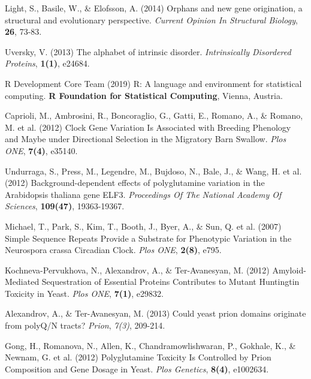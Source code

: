 \documentclass[a4,center,fleqn]{NAR}
\begin{document}
\begin{thebibliography}{4}
Light, S., Basile, W., \& Elofsson, A. (2014)
Orphans and new gene origination, a structural and evolutionary perspective. 
\textit{Current Opinion In Structural Biology}, \textbf{26}, 73-83. 

Uversky, V. (2013)
The alphabet of intrinsic disorder. 
\textit{Intrinsically Disordered Proteins}, \textbf{1(1)}, e24684. 

R Development Core Team (2019)
R: A language and environment for statistical computing.
\textbf{R Foundation for Statistical Computing}, Vienna, Austria.

Caprioli, M., Ambrosini, R., Boncoraglio, G., Gatti, E., Romano, A., \& Romano, M. et al. (2012)
Clock Gene Variation Is Associated with Breeding Phenology and Maybe under Directional Selection in the Migratory Barn Swallow. 
\textit{Plos ONE}, \textbf{7(4)}, e35140. 

Undurraga, S., Press, M., Legendre, M., Bujdoso, N., Bale, J., \& Wang, H. et al. (2012)
Background-dependent effects of polyglutamine variation in the Arabidopsis thaliana gene ELF3.
\textit{Proceedings Of The National Academy Of Sciences}, \textbf{109(47)}, 19363-19367. 

Michael, T., Park, S., Kim, T., Booth, J., Byer, A., \& Sun, Q. et al. (2007)
Simple Sequence Repeats Provide a Substrate for Phenotypic Variation in the Neurospora crassa Circadian Clock. 
\textit{Plos ONE}, \textbf{2(8)}, e795. 

Kochneva-Pervukhova, N., Alexandrov, A., \& Ter-Avanesyan, M. (2012)
Amyloid-Mediated Sequestration of Essential Proteins Contributes to Mutant Huntingtin Toxicity in Yeast. 
\textit{Plos ONE}, \textbf{7(1)}, e29832. 

Alexandrov, A., \& Ter-Avanesyan, M. (2013)
Could yeast prion domains originate from polyQ/N tracts?
\textit{Prion}, \textit{7(3)}, 209-214. 

Gong, H., Romanova, N., Allen, K., Chandramowlishwaran, P., Gokhale, K., \& Newnam, G. et al. (2012)
Polyglutamine Toxicity Is Controlled by Prion Composition and Gene Dosage in Yeast. 
\textit{Plos Genetics}, \textbf{8(4)}, e1002634. 


\end{thebibliography}
\end{document}

